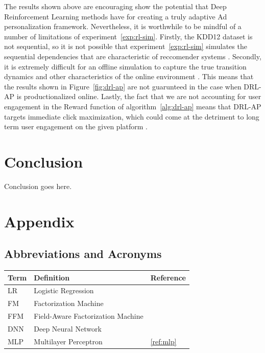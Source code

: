 \documentclass{mldsmsc}
\begin{document}
The results shown above are encouraging show the potential that Deep Reinforcement Learning
methods have for creating a truly adaptive Ad personalization framework. Nevertheless, it is worthwhile to be mindful of a number of limitations
of experiment~\ref{exp:rl-sim}. Firstly, the KDD12 dataset is not sequential, so it is not possible
that experiment~\ref{exp:rl-sim} simulates the sequential dependencies that are characteristic of
reccomender systems \citep{RefWorks:zheng2018drn:}. Secondly, it is extremely difficult for an offline
simulation to capture the true transition dynamics and other characteristics of the online environment
\citep{pike-burke2024LearnigAgents,RefWorks:wang2024deep,RefWorks:zheng2018drn:}. This means that
the results shown in Figure~\ref{fig:drl-ap} are not guarunteed in the case when DRL-AP is productionalized
online. Lastly, the fact that we are not accounting for user engagement in the Reward function of
algorithm~\ref{alg:drl-ap} means that DRL-AP targets immediate click maximization, which could come
at the detriment to long term user engagement on the given platform \cite{RefWorks:zheng2018drn:}.

\chapter{Conclusion}
\label{chap:conclusion}


Conclusion goes here. 





\clearpage
\renewcommand*{\thepage}{A\arabic{page}}

\appendix
%
\chapter{Appendix}

\section{Abbreviations and Acronyms}
\label{app:acronyms}

\begin{table}[ht]
    \begin{tabular}{|l|l|l|}
      \hline
        \textbf{Term} & \textbf{Definition} & \textbf{Reference} \\
      \hline
        LR& Logistic Regression & \\
        FM & Factorization Machine & \\
        FFM & Field-Aware Factorization Machine & \\
        DNN & Deep Neural Network & \\
        MLP & Multilayer Perceptron & \ref{ref:mlp} \\
    \hline
    \end{tabular}
\end{table}
\end{document}
